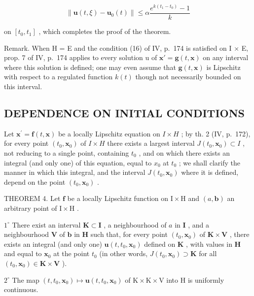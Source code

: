 \[
\| \mathbf {u} (t, \xi) - \mathbf {u} _ {0} (t) \| \leqslant \alpha \frac {e ^ {k \left(t _ {1} - t _ {0}\right)} - 1}{k}
\]

on \([t_{0}, t_{1}]\) , which completes the proof of the theorem.

Remark. When H = E and the condition (16) of IV, p.~174 is satisfied on I × E, prop. 7 of IV, p.~174 applies to every solution u of \(\mathbf{x}' = \mathbf{g}(t, \mathbf{x})\) on any interval where this solution is defined; one may even assume that \(\mathbf{g}(t,\mathbf{x})\) is Lipschitz with respect to a regulated function \(k(t)\) though not necessarily bounded on this interval.

\subsection{DEPENDENCE ON INITIAL CONDITIONS}

Let \(\mathbf{x}^{\prime}=\mathbf{f}(t,\mathbf{x})\) be a locally Lipschitz equation on \(I\times H\) ; by th. 2 (IV, p.~172), for every point \((t_{0},\mathbf{x}_{0})\) of \(I\times H\) there exists a largest interval \(J(t_{0},\mathbf{x}_{0})\subset I\) , not reducing to a single point, containing \(t_{0}\) , and on which there exists an integral (and only one) of this equation, equal to \(x_{0}\) at \(t_{0}\) ; we shall clarify the manner in which this integral, and the interval \(J(t_{0},\mathbf{x}_{0})\) where it is defined, depend on the point \((t_{0},\mathbf{x}_{0})\) .

THEOREM 4. Let \(\mathbf{f}\) be a locally Lipschitz function on \(\mathrm{I} \times \mathrm{H}\) and \((a, \mathbf{b})\) an arbitrary point of \(\mathrm{I} \times \mathrm{H}\) .

\(1^{\circ}\) There exist an interval \(\mathbf{K} \subset \mathbf{I}\) , a neighbourhood of \(a\) in \(\mathbf{I}\) , and a neighbourhood \(\mathbf{V}\) of \(\mathbf{b}\) in \(\mathbf{H}\) such that, for every point \((t_0, \mathbf{x}_0)\) of \(\mathbf{K} \times \mathbf{V}\) , there exists an integral (and only one) \(\mathbf{u}(t, t_0, \mathbf{x}_0)\) defined on \(\mathbf{K}\) , with values in \(\mathbf{H}\) and equal to \(\mathbf{x}_0\) at the point \(t_0\) (in other words, \(J(t_0, \mathbf{x}_0) \supset \mathbf{K}\) for all \((t_0, \mathbf{x}_0) \in \mathbf{K} \times \mathbf{V}\) ).

\(2^{\circ}\) The map \((t,t_0,\mathbf{x}_0)\mapsto \mathbf{u}(t,t_0,\mathbf{x}_0)\) of \(\mathrm{K}\times \mathrm{K}\times \mathrm{V}\) into H is uniformly continuous.

